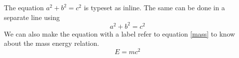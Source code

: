 \documentclass{article}
\date=06
\begin{document}
The equation $a^2 + b^2 = c^2$ is typeset as inline. The same can be done in a separate line using
\begin{equation}
  a^2 + b^2 = c^2
\end{equation}
We can also make the equation with a label refer to equation \eqref{mass} to know about the mass energy relation.
\begin{equation}
  E = mc^2 \label{mass}
\end{equation}
\end{document}
